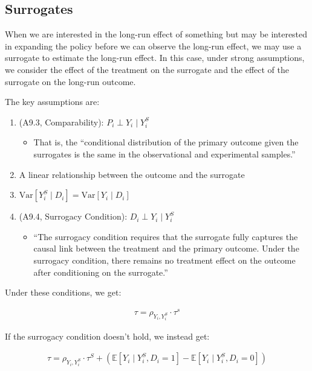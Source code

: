 \documentclass[10pt]{article}
\begin{document}
\subsection{Surrogates}

When we are interested in the long-run effect of something 
but may be interested in expanding the policy before we 
can observe the long-run effect, we may use a surrogate
to estimate the long-run effect. In this case, under strong assumptions,
we consider the effect of the treatment on the surrogate
and the effect of the surrogate on the long-run outcome.

The key assumptions are:

\begin{notes}
    \begin{enumerate}
        \item (A9.3, Comparability): $P_i \perp Y_i \mid Y_i^S$
            \begin{itemize}
                \item That is, 
                    the ``conditional distribution of the primary 
                    outcome given the surrogates is the
                    same in the observational and experimental samples.''
            \end{itemize}
        \item A linear relationship between the outcome and the surrogate
        \item $\text{Var}\left[Y_i^S \mid D_i\right]=\text{Var}\left[Y_i \mid D_i\right]$
        \item (A9.4, Surrogacy Condition): $D_i \perp Y_i \mid Y_i^S$
            \begin{itemize}
                \item ``The surrogacy condition requires that the surrogate 
                fully captures the causal link between the treatment and 
                the primary outcome. Under the surrogacy condition, 
                there remains no treatment effect on the outcome after 
                conditioning on the surrogate.''
            \end{itemize}
    \end{enumerate}
\end{notes}

Under these conditions, we get:

\begin{align}
    \tau=\rho_{Y_i, Y_i^S} \cdot \tau^s
\end{align}

If the surrogacy condition doesn't hold, we instead get:

\begin{align}
    \tau=\rho_{Y_i, Y_i^S} \cdot \tau^S+\left(\mathbb{E}\left[Y_i \mid Y_i^S, D_i=1\right]-\mathbb{E}\left[Y_i \mid Y_i^S, D_i=0\right]\right)
\end{align}
\end{document}
